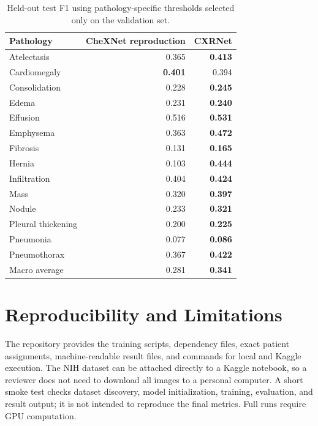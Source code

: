 \begin{table}[ht]
\centering
\small
\begin{tabular}{lrr}
\hline
\textbf{Pathology} & \textbf{CheXNet reproduction} & \textbf{CXRNet} \\
\hline
Atelectasis        & 0.365 & \textbf{0.413} \\
Cardiomegaly       & \textbf{0.401} & 0.394 \\
Consolidation      & 0.228 & \textbf{0.245} \\
Edema              & 0.231 & \textbf{0.240} \\
Effusion           & 0.516 & \textbf{0.531} \\
Emphysema          & 0.363 & \textbf{0.472} \\
Fibrosis           & 0.131 & \textbf{0.165} \\
Hernia             & 0.103 & \textbf{0.444} \\
Infiltration       & 0.404 & \textbf{0.424} \\
Mass               & 0.320 & \textbf{0.397} \\
Nodule             & 0.233 & \textbf{0.321} \\
Pleural thickening & 0.200 & \textbf{0.225} \\
Pneumonia          & 0.077 & \textbf{0.086} \\
Pneumothorax       & 0.367 & \textbf{0.422} \\
\hline
Macro average      & 0.281 & \textbf{0.341} \\
\hline
\end{tabular}
\caption{Held-out test F1 using pathology-specific thresholds selected only on
the validation set.}
\label{tab:f1_by_disease}
\end{table}

\section{Reproducibility and Limitations}

The repository provides the training scripts, dependency files, exact patient
assignments, machine-readable result files, and commands for local and Kaggle
execution. The NIH dataset can be attached directly to a Kaggle notebook, so a
reviewer does not need to download all images to a personal computer. A short
smoke test checks dataset discovery, model initialization, training,
evaluation, and result output; it is not intended to reproduce the final
metrics. Full runs require GPU computation.

